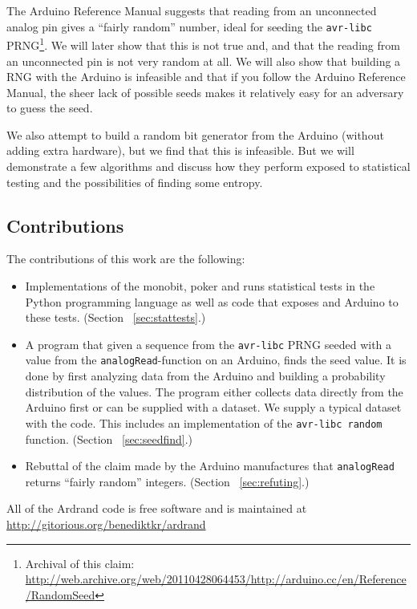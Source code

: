 \documentclass[a4paper]{article}           %
\begin{document}
The Arduino Reference Manual suggests that reading from an unconnected analog pin gives a ``fairly random'' number\cite{ardref}, ideal for seeding the \texttt{avr-libc} PRNG\footnote{Archival of this claim: \url{http://web.archive.org/web/20110428064453/http://arduino.cc/en/Reference/RandomSeed}}. We will later show that this is not true and, and that the reading from an unconnected pin is not very random at all. We will also show that building a RNG with the Arduino is infeasible and that if you follow the Arduino Reference Manual, the sheer lack of possible seeds makes it relatively easy for an adversary to guess the seed.

We also attempt to build a random bit generator from the Arduino (without adding extra hardware), but we find that this is infeasible. But we will demonstrate a few algorithms and discuss how they perform exposed to statistical testing and the possibilities of finding some entropy. 

\subsection{Contributions}

The contributions of this work are the following:

\begin{itemize}
\item Implementations of the monobit, poker and runs statistical tests in the Python programming language as well as code that exposes and Arduino to these tests. (Section ~\ref{sec:stattests}.)
\item A program that given a sequence from the \texttt{avr-libc} PRNG seeded with a value from the \texttt{analogRead}-function on an Arduino, finds the seed value. It is done by first analyzing data from the Arduino and building a probability distribution of the values. The program either collects data directly from the Arduino first or can be supplied with a dataset. We supply a typical dataset with the code. This includes an implementation of the \texttt{avr-libc random} function. (Section ~\ref{sec:seedfind}.)
\item Rebuttal of the claim made by the Arduino manufactures that \texttt{analogRead} returns ``fairly random'' integers\cite{ardref}. (Section ~\ref{sec:refuting}.)

\end{itemize}

All of the Ardrand code is free software and is maintained at \url{http://gitorious.org/benediktkr/ardrand}
\end{document}
